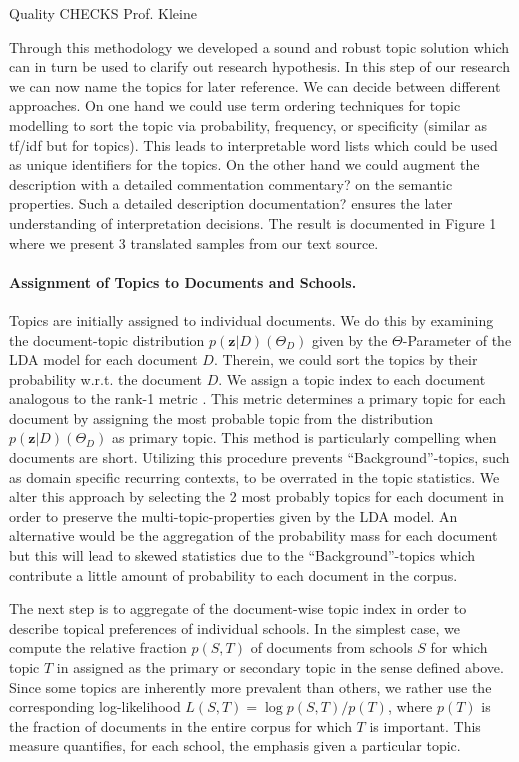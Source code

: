 \documentclass[a4paper,10pt]{article}
\newcommand{\TODO}[1]{\begingroup\color{red}#1\endgroup}
\newcommand{\PFS}[1]{\begingroup\color{blue}#1\endgroup}
\newcommand{\NR}[1]{\begingroup\color{orange}#1\endgroup}
\begin{document}
{Quality CHECKS Prof. Kleine

Through this methodology we developed a sound and robust topic solution
which can in turn be used to clarify out research hypothesis.
In this step of our research we can now name
the topics for later reference. We can decide between different approaches. On one hand 
we could use term ordering techniques for topic modelling to sort the topic via 
probability, frequency, or specificity (similar as tf/idf but for topics). This leads to 
interpretable word lists which could be used as unique identifiers for the topics. On
the other hand we could augment the description with a detailed commentation \NR{commentary?} on the 
semantic properties. Such a detailed description \NR{documentation?} ensures the later understanding of 
interpretation decisions. The result is documented in \TODO{Figure 1} where we present 3 
translated samples from our text source.


\paragraph{Assignment of Topics to Documents and Schools.} 

\PFS{Topics are initially assigned to individual documents.} We do this by examining  the document-topic distribution $p(\mathbf{z}|D) (\Theta_D)$ given by the $\Theta$-Parameter of the LDA model for each document $D$. Therein, we could sort the topics by their probability w.r.t. the document $D$. We assign a topic index to each document analogous to the rank-1 metric \cite{evans:2014}. This metric determines a primary topic for each document by assigning  the most probable topic from the distribution $p(\mathbf{z}|D) (\Theta_D)$ as primary topic.  This method is particularly compelling when documents are short. Utilizing this procedure prevents "`Background"'-topics, such as domain specific recurring contexts, to be overrated in the topic statistics. We alter this approach by selecting the 2 most probably topics for each document in order to preserve the  \NR{multi-topic-properties} given by the LDA model. An alternative would be the aggregation of the probability mass for each document but this will lead to skewed statistics due to the "`Background"'-topics which contribute a little amount of probability to each document in the corpus.

The next step is to aggregate of the document-wise topic index in order to
describe topical preferences of individual schools.  In the simplest case,
we compute the relative fraction $p(S,T)$ of documents from schools $S$ for
which topic $T$ in assigned as the primary or secondary topic in the sense defined above.  Since
some topics are inherently more prevalent than others, we rather use the
corresponding log-likelihood $L(S,T) = \log p(S,T)/p(T)$, where $p(T)$ is
the fraction of documents in the entire corpus for which $T$ is
important. This measure quantifies, for each \TODO{school}, the emphasis
given a particular topic.


}
\end{document}
